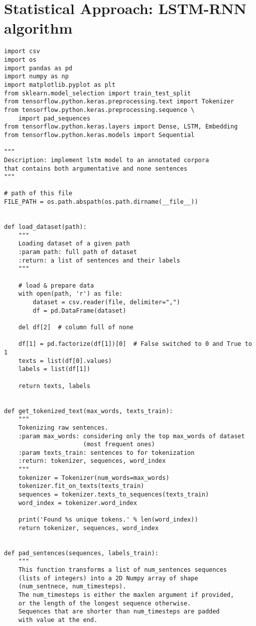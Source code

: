 
\chapter{Statistical Approach: LSTM-RNN algorithm}

\label{Appendix10}

\begin{lstlisting}[language=iPython]
import csv
import os
import pandas as pd
import numpy as np
import matplotlib.pyplot as plt
from sklearn.model_selection import train_test_split
from tensorflow.python.keras.preprocessing.text import Tokenizer
from tensorflow.python.keras.preprocessing.sequence \
	import pad_sequences
from tensorflow.python.keras.layers import Dense, LSTM, Embedding
from tensorflow.python.keras.models import Sequential

"""
Description: implement lstm model to an annotated corpora
that contains both argumentative and none sentences
"""

# path of this file
FILE_PATH = os.path.abspath(os.path.dirname(__file__))


def load_dataset(path):
	"""
	Loading dataset of a given path
	:param path: full path of dataset
	:return: a list of sentences and their labels
	"""
	
	# load & prepare data
	with open(path, 'r') as file:
		dataset = csv.reader(file, delimiter=",")
		df = pd.DataFrame(dataset)
	
	del df[2]  # column full of none
	
	df[1] = pd.factorize(df[1])[0]  # False switched to 0 and True to 1
	texts = list(df[0].values)
	labels = list(df[1])
	
	return texts, labels


def get_tokenized_text(max_words, texts_train):
	"""
	Tokenizing raw sentences.
	:param max_words: considering only the top max_words of dataset 
					  (most frequent ones)
	:param texts_train: sentences to for tokenization
	:return: tokenizer, sequences, word_index
	"""
	tokenizer = Tokenizer(num_words=max_words)
	tokenizer.fit_on_texts(texts_train)
	sequences = tokenizer.texts_to_sequences(texts_train)
	word_index = tokenizer.word_index
	
	print('Found %s unique tokens.' % len(word_index))
	return tokenizer, sequences, word_index


def pad_sentences(sequences, labels_train):
	"""
	This function transforms a list of num_sentences sequences
	(lists of integers) into a 2D Numpy array of shape 
	(num_sentnece, num_timesteps).
	The num_timesteps is either the maxlen argument if provided,
	or the length of the longest sequence otherwise.
	Sequences that are shorter than num_timesteps are padded 
	with value at the end.
	

\end{lstlisting}
